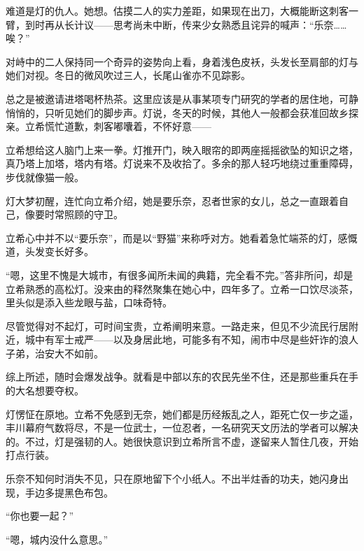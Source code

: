 \documentclass{article}
\begin{document}
难道是灯的仇人。她想。估摸二人的实力差距，如果现在出刀，大概能断这刺客一臂，到时再从长计议——思考尚未中断，传来少女熟悉且诧异的喊声：“乐奈……唉？”



对峙中的二人保持同一个奇异的姿势向上看，身着浅色皮袄，头发长至肩部的灯与她们对视。冬日的微风吹过三人，长尾山雀亦不见踪影。



总之是被邀请进塔喝杯热茶。这里应该是从事某项专门研究的学者的居住地，可静悄悄的，只听见她们的脚步声。灯说，冬天的时候，其他人一般都会获准回故乡探亲。立希慌忙道歉，刺客嘟囔着，不怀好意——



立希想给这人脑门上来一拳。灯推开门，映入眼帘的即两座摇摇欲坠的知识之塔，真乃塔上加塔，塔内有塔。灯说来不及收拾了。多余的那人轻巧地绕过重重障碍，步伐就像猫一般。



灯大梦初醒，连忙向立希介绍，她是要乐奈，忍者世家的女儿，总之一直跟着自己，像要时常照顾的守卫。



立希心中并不以“要乐奈”，而是以“野猫”来称呼对方。她看着急忙端茶的灯，感慨道，头发变长好多。



“嗯，这里不愧是大城市，有很多闻所未闻的典籍，完全看不完。”答非所问，却是立希熟悉的高松灯。没来由的释然聚集在她心中，四年多了。立希一口饮尽淡茶，里头似是添入些龙眼与盐，口味奇特。



尽管觉得对不起灯，可时间宝贵，立希阐明来意。一路走来，但见不少流民行居附近，城中有军士戒严——以及身居此地，可能多有不知，闹市中尽是些奸诈的浪人子弟，治安大不如前。



综上所述，随时会爆发战争。就看是中部以东的农民先坐不住，还是那些重兵在手的大名想要夺权。



灯愣怔在原地。立希不免感到无奈，她们都是历经叛乱之人，距死亡仅一步之遥，丰川幕府气数将尽，不是一位武士，一位忍者，一名研究天文历法的学者可以解决的。不过，灯是强韧的人。她很快意识到立希所言不虚，遂留来人暂住几夜，开始打点行装。



乐奈不知何时消失不见，只在原地留下个小纸人。不出半炷香的功夫，她闪身出现，手边多提黑色布包。



“你也要一起？”



“嗯，城内没什么意思。”
\end{document}
